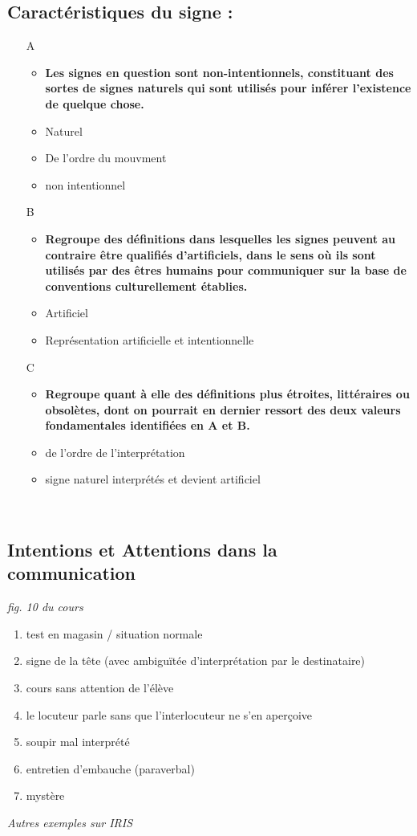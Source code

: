 \subsection{Caractéristiques du signe :}
\begin{itemize}
   \item[A]
      \begin{itemize} 
         \item \textbf{Les signes en question sont non-intentionnels, constituant des sortes de signes naturels qui sont utilisés pour inférer l'existence de quelque chose.}
         \item Naturel 
         \item De l'ordre du mouvment
         \item non intentionnel
      \end{itemize}
   \item[B]
      \begin{itemize} 
         \item \textbf{Regroupe des définitions dans lesquelles les signes peuvent au contraire être qualifiés d'artificiels, dans le sens où ils sont utilisés par des êtres humains pour communiquer sur la base de conventions culturellement établies.}
         \item Artificiel
         \item Représentation artificielle et intentionnelle
      \end{itemize}
   \item[C]
      \begin{itemize} 
         \item \textbf{Regroupe quant à elle des définitions plus étroites, littéraires ou obsolètes, dont on pourrait en dernier ressort des deux valeurs fondamentales identifiées en A et B.}
         \item de l'ordre de l'interprétation
         \item signe naturel interprétés et devient artificiel
      \end{itemize}
\end{itemize}
\\

\subsection{Intentions et Attentions dans la communication}
\textit{fig. 10 du cours}

\begin{enumerate}
         \item test en magasin / situation normale
         \item signe de la tête (avec ambiguïtée d'interprétation par le destinataire)
         \item cours sans attention de l'élève
         \item le locuteur parle sans que l'interlocuteur ne s'en aperçoive 
         \item soupir mal interprété 
         \item entretien d'embauche (paraverbal)
         \item mystère 
\end{enumerate}
\textit{Autres exemples sur IRIS}

